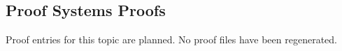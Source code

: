 \subsection*{Proof Systems Proofs}

Proof entries for this topic are planned. No proof files have been regenerated.
